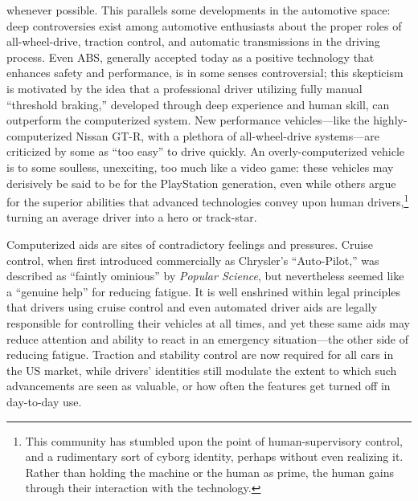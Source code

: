whenever possible\cite{???}. This parallels some developments
in the automotive space: deep controversies exist among automotive
enthusiasts about the proper roles of all-wheel-drive, traction
control, and automatic transmissions in the driving process. Even ABS,
generally accepted today as a positive technology that enhances safety and
performance, is in some senses controversial; this skepticism is
motivated by the idea that 
a professional driver utilizing fully manual ``threshold braking,''
developed through deep experience and human skill, can outperform the
computerized system\cite{???}. New performance vehicles---like the
highly-computerized Nissan GT-R, with a plethora of all-wheel-drive
systems---are criticized by some as ``too easy'' to drive quickly\cite{???}.
An overly-computerized vehicle is to some soulless, unexciting, too much like
a video game: these vehicles may derisively be said to be for the
PlayStation generation, even while others argue for the superior
abilities that advanced technologies convey upon human
drivers,\footnote{This community has stumbled upon the point of
  human-supervisory control, and a rudimentary sort of cyborg
  identity, perhaps without even realizing it. Rather than holding the
machine or the human as prime, the human gains through their
interaction with the technology.}
turning an average driver into a hero or track-star\cite{???}.

Computerized aids are sites of contradictory feelings and pressures.
Cruise control, when first introduced commercially as Chrysler's ``Auto-Pilot,''
was described as ``faintly
ominious'' by \emph{Popular Science}, but nevertheless seemed like a
``genuine help'' for reducing
fatigue\cite{???http://www.brookings.edu/research/papers/2014/04/products-liability-driverless-cars-villasenor}.
It is well enshrined within legal principles that drivers using
cruise control and even automated driver aids are legally responsible
for controlling their vehicles at all times, and yet these same aids
may reduce attention and ability to react in an emergency
situation---the other side of reducing fatigue.
Traction and stability control are now required for all cars in the US
market,\cite{???-brookings} while drivers' identities still modulate the
extent to which such
advancements are seen as valuable, or how often the features get
turned off in day-to-day use. 

